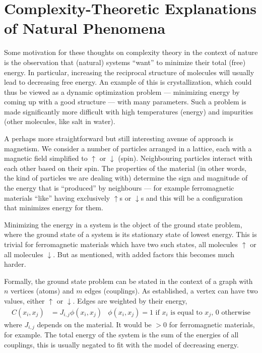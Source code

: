 \documentclass{article}
\begin{document}
\section*{Complexity-Theoretic Explanations of Natural Phenomena}

Some motivation for these thoughts on complexity theory in the context of nature is the observation that (natural) systems \enquote{want} to minimize their total (free) energy. In particular, increasing the reciprocal structure of molecules will usually lead to decreasing free energy. An example of this is crystallization, which could thus be viewed as a dynamic optimization problem --- minimizing energy by coming up with a good structure --- with many parameters. Such a problem is made significantly more difficult with high temperatures (energy) and impurities (other molecules, like salt in water).

A perhaps more straightforward but still interesting avenue of approach is magnetism. We consider a number of particles arranged in a lattice, each with a magnetic field simplified to $\uparrow$ or $\downarrow$ (spin). Neighbouring particles interact with each other based on their spin. The properties of the material (in other words, the kind of particles we are dealing with) determine the sign and magnitude of the energy that is \enquote{produced} by neighbours --- for example ferromagnetic materials \enquote{like} having exclusively $\uparrow$s or $\downarrow$s and this will be a configuration that minimizes energy for them.

Minimizing the energy in a system is the object of the ground state problem, where the ground state of a system is its stationary state of lowest energy. This is trivial for ferromagnetic materials which have two such states, all molecules $\uparrow$ or all molecules $\downarrow$. But as mentioned, with added factors this becomes much harder.

Formally, the ground state problem can be stated in the context of a graph with $n$ vertices (atoms) and $m$ edges (couplings). As established, a vertex can have two values, either $\uparrow$ or $\downarrow$. Edges are weighted by their energy,
\begin{align*}
    C(x_i, x_j) &= J_{i, j}\phi(x_i, x_j) & \phi(x_i, x_j) = \text{1 if $x_i$ is equal to $x_j$, 0 otherwise} 
\end{align*}
where $J_{i, j}$ depends on the material. It would be $>0$ for ferromagnetic materials, for example. The total energy of the system is the sum of the energies of all couplings, this is usually negated to fit with the model of decreasing energy.
\end{document}
